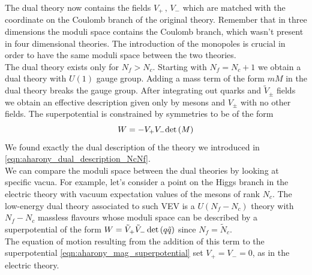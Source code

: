 The dual theory now contains the fields $V_+ \, , \, V_-$ which are matched with the coordinate on the Coulomb branch of the original theory.
Remember that in three dimensions the moduli space contains the Coulomb branch, which wasn't present in four dimensional theories.
The introduction of the monopoles is crucial in order to have the same moduli space between the two theories.\\
The dual theory exists only for $N_f > N_c$. 
Starting with $N_f =N_c + 1$ we obtain a dual theory with $U(1)$ gauge group. Adding a mass term of the form $m M$ in the dual theory breaks the gauge group. After integrating out quarks and $\tilde{V}_{\pm}$ fields we obtain an effective description given only by mesons and $V_{\pm}$ with no other fields.
The superpotential is constrained by symmetries to be of the form 
\begin{equation}
W = - V_+ V_- \mathrm{det } \,{(M)}
\end{equation}
We found exactly the dual description of the theory we introduced in \eqref{eqn:aharony_dual_description_NcNf}.
\\
We can compare the moduli space between the dual theories by looking at specific vacua.
For example, let's consider a point on the Higgs branch in the electric theory with vacuum expectation values of the mesons of rank $N_c$.
The low-energy dual theory associated to such VEV is a $U(N_f - N_c)$ theory with $N_f - N_c$ massless flavours whose moduli space can be described by a superpotential of the form $W = \tilde{V}_+ \tilde{V}_- \, \mathrm{det } \,{( q \tilde{q})} $ since $N_f = \tilde{N}_c$.
\\
The equation of motion resulting from the addition of this term to the superpotential \eqref{eqn:aharony_mag_superpotential} set $V_+ = V_-= 0$, as in the electric theory.\\















